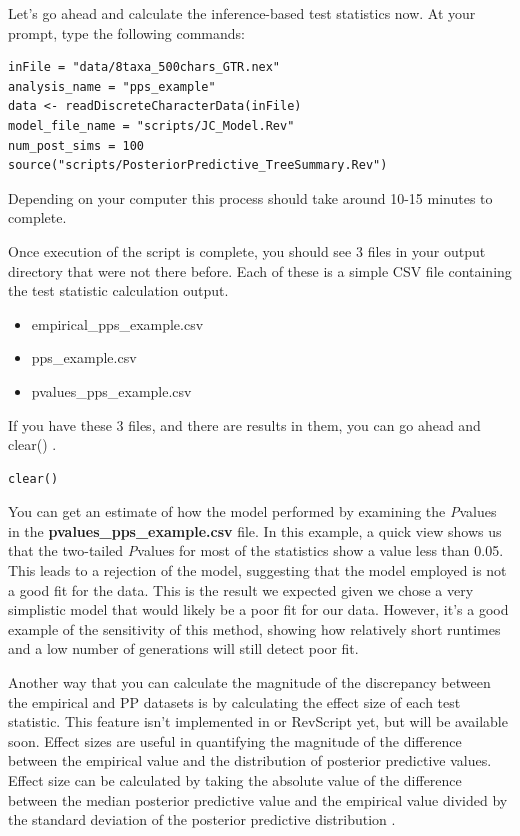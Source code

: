 \begin{equation *}
\begin{equation *}
\begin{equation *}
Let's go ahead and calculate the inference-based test statistics now. At your \RevBayes prompt, type the 
following commands: 

{\tt \begin{Snugshade}[184,207,236]
\begin{lstlisting}  
inFile = "data/8taxa_500chars_GTR.nex"
analysis_name = "pps_example"
data <- readDiscreteCharacterData(inFile)
model_file_name = "scripts/JC_Model.Rev"
num_post_sims = 100
source("scripts/PosteriorPredictive_TreeSummary.Rev")
\end{lstlisting}
\end{Snugshade}}

Depending on your computer this process should take around 10-15 minutes to complete. 

Once execution of the script is complete, you should see 3 files in your output directory that were not 
there before. Each of these is a simple CSV file containing the test statistic calculation output.

\begin{itemize}
\item empirical\_pps\_example.csv
\item pps\_example.csv
\item pvalues\_pps\_example.csv
\end{itemize}

If you have these 3 files, and there are results in them, you can go ahead and clear() \RevBayes.

{\tt \begin{Snugshade}[184,207,236]
\begin{lstlisting}  
clear()
\end{lstlisting}
\end{Snugshade}}

You can get an estimate of how the model performed by examining the \textit{P}\-values in the 
\textbf{pvalues\_pps\_example.csv} file. In this example, a quick view shows us that the two-tailed \textit{P}\-values
for most of the statistics show a value less than 0.05. This leads to a rejection of the model, suggesting 
that the model employed is not a good fit for the data. This is the result we expected given we chose a very 
simplistic model that would likely be a poor fit for our data. However, it's a good example 
of the sensitivity of this method, showing how relatively short runtimes and a low number of generations will 
still detect poor fit. 

Another way that you can calculate the magnitude of the discrepancy between the empirical and PP datasets is by
calculating the effect size of each test statistic. This feature isn't implemented in \RevBayes or RevScript yet, 
but will be available soon. Effect sizes are useful in quantifying the magnitude of the difference between the 
empirical value and the distribution of posterior predictive values. Effect size can be calculated by taking the 
absolute value of the difference between the median posterior predictive value and the empirical value divided by 
the standard deviation of the posterior predictive distribution \citep{Doyle2015-qb}.


\end{equation *}
\end{equation *}
\end{equation *}
